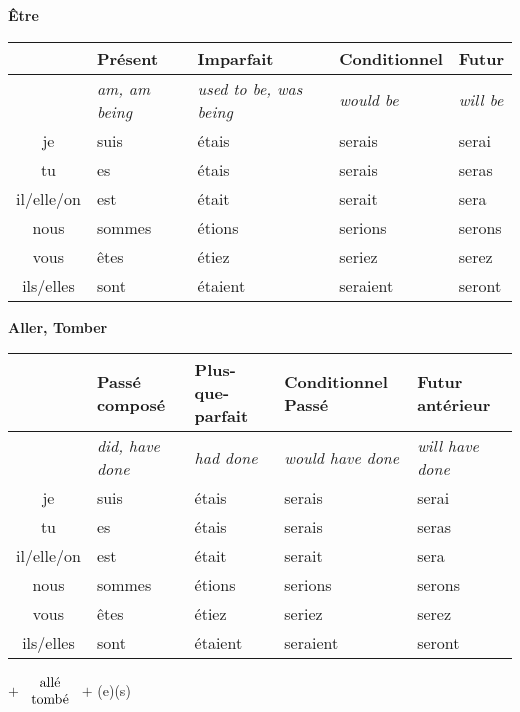 \clearpage
\begin{flushleft}
\textbf{\^Etre}
\vskip 0.1cm
\begin{tabular}{|c||L{2.5cm}|L{2.5cm}|L{2.5cm}|L{2.5cm}|}
\hline
& Pr\'esent & Imparfait & Conditionnel & Futur \\
\hline
& \textit{am, am being} & \textit{used to be, was being} & \textit{would be} & \textit{will be} \\
\hline\hline
je            &	suis	&	\'etais	&	serais	 &	serai	\\
tu            &	es 	&	\'etais	&	serais	&	seras	\\
il/elle/on  &	est	&	\'etait	&	serait	&	sera	\\
nous       &	sommes	&	\'etions	&	serions	&	serons	\\
vous       &	\^etes	&	\'etiez	&	seriez		&	serez	\\
ils/elles   &	sont 	&	\'etaient	&	seraient	&	seront	\\
\hline
\end{tabular}
\end{flushleft}

\begin{flushleft}
\textbf{Aller, Tomber}
\vskip 0.1cm
\begin{tabular}{|c||L{2.5cm}|L{2.5cm}|L{2.5cm}|L{2.5cm}|}
\hline
& Pass\'e compos\'e & Plus-que-parfait & Conditionnel Pass\'e & Futur ant\'erieur \\
\hline
& \textit{did, have done} & \textit{had done} & \textit{would have done} & \textit{will have done} \\
\hline\hline
je            &	suis	&	\'etais	&	serais	 &	serai	\\
tu            &	es 	&	\'etais	&	serais	&	seras	\\
il/elle/on  &	est	&	\'etait	&	serait	&	sera	\\
nous       &	sommes	&	\'etions	&	serions	&	serons	\\
vous       &	\^etes	&	\'etiez	&	seriez		&	serez	\\
ils/elles   &	sont 	&	\'etaient	&	seraient	&	seront	\\
\hline
\end{tabular}
\;$+$
$\begin{array}{c}
\textnormal{all\'e}
\\
\textnormal{tomb\'e}
\end{array}$
$+$ (e)(s)
\end{flushleft}


